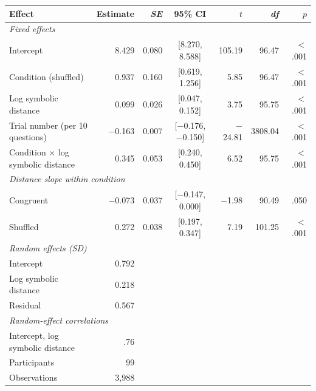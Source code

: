 \begin{tabular}{lrrcrrr}
\toprule
Effect & Estimate & \textit{SE} & 95\% CI & $t$ & \textit{df} & $p$ \\
\midrule
\multicolumn{7}{l}{\textit{Fixed effects}} \\
\quad Intercept & 8.429 & 0.080 & [8.270, 8.588] & 105.19 & 96.47 & $<$.001 \\
\quad Condition (shuffled) & 0.937 & 0.160 & [0.619, 1.256] & 5.85 & 96.47 & $<$.001 \\
\quad Log symbolic distance & 0.099 & 0.026 & [0.047, 0.152] & 3.75 & 95.75 & $<$.001 \\
\quad Trial number (per 10 questions) & $-$0.163 & 0.007 & [$-$0.176, $-$0.150] & $-$24.81 & 3808.04 & $<$.001 \\
\quad Condition $\times$ log symbolic distance & 0.345 & 0.053 & [0.240, 0.450] & 6.52 & 95.75 & $<$.001 \\
\multicolumn{7}{l}{\textit{Distance slope within condition}} \\
\quad Congruent & $-$0.073 & 0.037 & [$-$0.147, 0.000] & $-$1.98 & 90.49 & .050 \\
\quad Shuffled & 0.272 & 0.038 & [0.197, 0.347] & 7.19 & 101.25 & $<$.001 \\
\multicolumn{7}{l}{\textit{Random effects (SD)}} \\
\quad Intercept & 0.792 \\
\quad Log symbolic distance & 0.218 \\
\quad Residual & 0.567 \\
\multicolumn{7}{l}{\textit{Random-effect correlations}} \\
\quad Intercept, log symbolic distance & .76 \\
\midrule
Participants & 99 \\
Observations & 3,988 \\
\bottomrule
\end{tabular}
